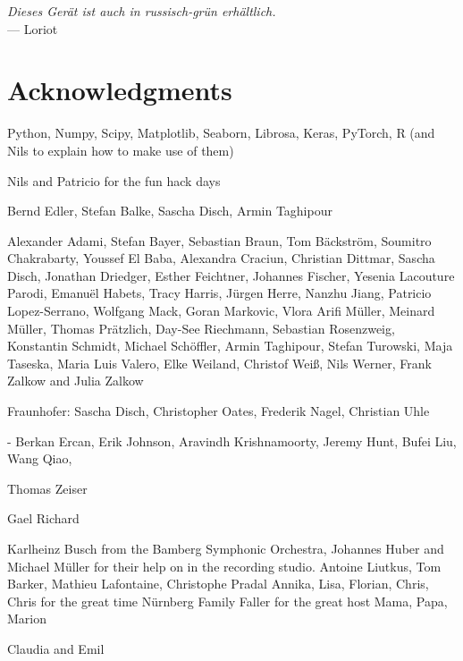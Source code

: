 
\begin{flushright}{\slshape
    Dieses Gerät ist auch in russisch-grün erhältlich.
    }\\ \medskip
    --- Loriot
\end{flushright}



\bigskip

\begingroup
\let\clearpage\relax
\let\cleardoublepage\relax
\let\cleardoublepage\relax
\chapter*{Acknowledgments}

Python, Numpy, Scipy, Matplotlib, Seaborn, Librosa, Keras, PyTorch, R (and Nils to explain how to make use of them)

Nils and Patricio for the fun hack days

Bernd Edler, Stefan Balke, Sascha Disch, Armin Taghipour

Alexander Adami, Stefan Bayer, Sebastian Braun, Tom Bäckström, Soumitro Chakrabarty, 
Youssef El Baba, Alexandra Craciun, Christian Dittmar, Sascha Disch, Jonathan Driedger, Esther Feichtner, Johannes Fischer, 
Yesenia Lacouture Parodi, Emanuël Habets, Tracy Harris, Jürgen Herre, Nanzhu Jiang, 
Patricio Lopez-Serrano, Wolfgang Mack, Goran Markovic, Vlora Arifi Müller, Meinard Müller, Thomas Prätzlich, 
Day-See Riechmann, Sebastian Rosenzweig, Konstantin Schmidt, Michael Schöffler, Armin Taghipour, 
Stefan Turowski, Maja Taseska, Maria Luis Valero, Elke Weiland, Christof Weiß, Nils Werner, 
Frank Zalkow and Julia Zalkow

Fraunhofer: Sascha Disch, Christopher Oates, Frederik Nagel, Christian Uhle

- Berkan Ercan, Erik Johnson, Aravindh Krishnamoorty, Jeremy Hunt, Bufei Liu, Wang Qiao, 

Thomas Zeiser



Gael Richard
\bigskip

\bigskip
Karlheinz Busch from the Bamberg Symphonic Orchestra, Johannes Huber and Michael Müller for their help on in the recording studio.
\bigskip
Antoine Liutkus, Tom Barker, Mathieu Lafontaine, Christophe Pradal
\bigskip
Annika, Lisa, Florian, Chris, Chris for the great time Nürnberg
\bigskip
Family Faller for the great host
Mama, Papa, Marion

\bigskip

Claudia and Emil

\endgroup
